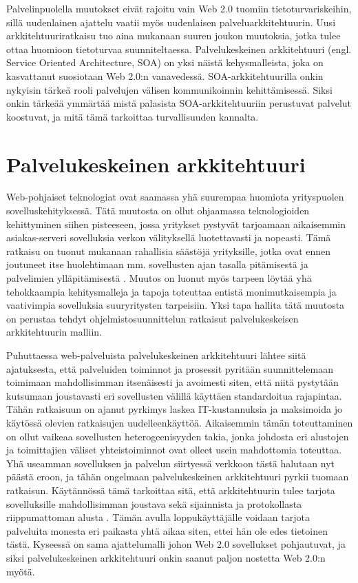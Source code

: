 Palvelinpuolella muutokset eivät rajoitu vain Web 2.0 tuomiin
tietoturvariskeihin, sillä uudenlainen ajattelu vaatii myös uudenlaisen
palveluarkkitehtuurin. Uusi arkkitehtuuriratkaisu tuo aina mukanaan suuren
joukon muutoksia, jotka tulee ottaa huomioon tietoturvaa suunniteltaessa.
Palvelukeskeinen arkkitehtuuri (engl. Service Oriented Architecture, SOA) on
yksi näistä kehysmalleista, joka on kasvattanut suosiotaan Web 2.0:n
vanavedessä. SOA-arkkitehtuurilla onkin nykyisin tärkeä rooli palvelujen
välisen kommunikoinnin kehittämisessä. Siksi onkin tärkeää ymmärtää mistä
palasista SOA-arkkitehtuuriin perustuvat palvelut koostuvat, ja mitä tämä
tarkoittaa turvallisuuden kannalta.

\section{Palvelukeskeinen arkkitehtuuri}

Web-pohjaiset teknologiat ovat saamassa yhä suurempaa huomiota yrityspuolen
sovelluskehityksessä. Tätä muutosta on ollut ohjaamassa teknologioiden
kehittyminen siihen pisteeseen, jossa yritykset pystyvät tarjoamaan aikaisemmin
asiakas-serveri sovelluksia verkon välityksellä luotettavasti ja nopeasti. Tämä
ratkaisu on tuonut mukanaan rahallisia säästöjä yrityksille, jotka ovat ennen
joutuneet itse huolehtimaan mm. sovellusten ajan tasalla pitämisestä ja
palvelimien ylläpitämisestä \cite{WEB2}. Muutos on luonut myös tarpeen löytää yhä
tehokkaampia kehitysmalleja ja tapoja toteuttaa entistä monimutkaisempia ja
vaativimpia sovelluksia suuryritysten tarpeisiin. Yksi tapa hallita tätä
muutosta on perustaa tehdyt ohjelmistosuunnittelun ratkaisut palvelukeskeisen
arkkitehtuurin malliin.

Puhuttaessa web-palveluista palvelukeskeinen arkkitehtuuri lähtee siitä
ajatuksesta, että palveluiden toiminnot ja prosessit pyritään suunnittelemaan
toimimaan mahdollisimman itsenäisesti ja avoimesti siten, että niitä pystytään
kutsumaan joustavasti eri sovellusten välillä käyttäen standardoitua rajapintaa.
Tähän ratkaisuun on ajanut pyrkimys laskea IT-kustannuksia ja maksimoida jo
käytössä olevien ratkaisujen uudelleenkäyttöä. Aikaisemmin tämän toteuttaminen
on ollut vaikeaa sovellusten heterogeenisyyden takia, jonka johdosta eri
alustojen ja toimittajien väliset yhteistoiminnot ovat olleet usein mahdottomia
toteuttaa. Yhä useamman sovelluksen ja palvelun siirtyessä verkkoon tästä
halutaan nyt päästä eroon, ja tähän ongelmaan palvelukeskeinen arkkitehtuuri
pyrkii tuomaan ratkaisun. Käytännössä tämä tarkoittaa sitä, että arkkitehtuurin
tulee tarjota sovelluksille mahdollisimman joustava sekä sijainnista ja
protokollasta riippumattoman alusta \cite{SOA}. Tämän avulla loppukäyttäjälle
voidaan tarjota palveluita monesta eri paikasta yhtä aikaa siten, ettei hän ole
edes tietoinen tästä. Kyseessä on sama ajattelumalli johon Web 2.0 sovellukset
pohjautuvat, ja siksi palvelukeskeinen arkkitehtuuri onkin saanut paljon
nostetta Web 2.0:n myötä.


